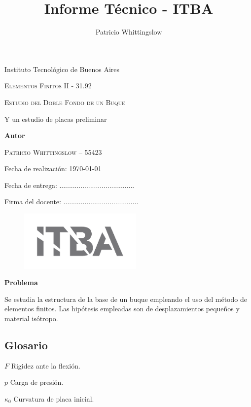 \documentclass[onecolumn,10pt,titlepage]{article}
\title{Informe Técnico - ITBA}
\author{Patricio Whittingslow}
\newcommand{\glossentry}[2]{$#1$ \indent #2 \par \vspace{.4cm} }
\begin{document}
\begin{titlepage}
	\centering
	
	{ \large Instituto Tecnológico de Buenos Aires  \par }
	\vspace{2cm}
	{\Large \scshape Elementos Finitos II - 31.92 \par}
	\vspace{2cm}
	{\Huge \scshape Estudio del Doble Fondo de un Buque\par }
	\vspace{.5cm}
	{\Large Y un estudio de placas preliminar \par}
	\vspace{2cm}
	{\large \bf Autor \par}
	\vspace{.5cm}
	\textsc{\large Patricio Whittingslow -- 55423}
	\vspace{2cm}
	{\par \large Fecha de realización: \today \par}
	\vspace{1cm}
	{\large Fecha de entrega: .......................................\par}
	\vspace{2.5cm}
	{\large Firma del docente: .......................................}
	\vspace{3cm}
	\begin{figure}[htb!]
		\centering
		\includegraphics[width=6cm]{fig/logoitba.png}
	\end{figure}
\end{titlepage}


{\textbf{Problema}}\par
Se estudia la estructura de la base de un buque empleando el uso del método de elementos finitos. Las hipótesis empleadas son de desplazamientos pequeños y material isótropo.

\begin{multicols}{2}
	\section*{Glosario}
	\glossentry{F}{Rigidez ante la flexión.}
	\glossentry{p}{Carga de presión.}
	\glossentry{\kappa_{0}}{Curvatura de placa inicial.}
\end{multicols}
\end{document}
